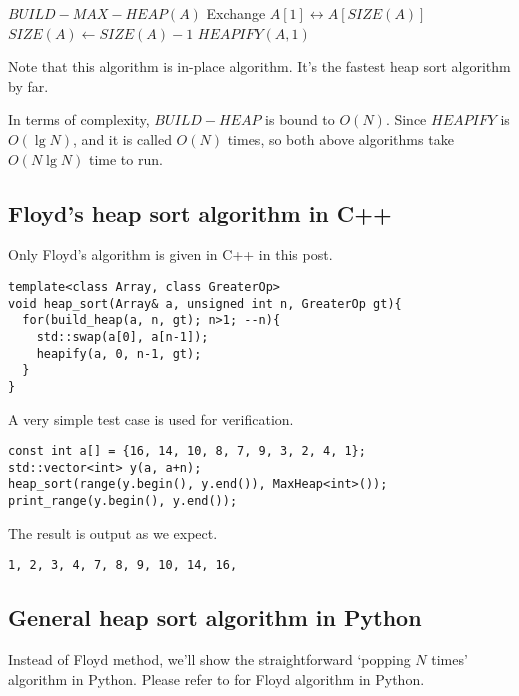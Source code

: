 \documentclass{article}
\begin{document}
\begin{algorithmic}[1]
  \State $BUILD-MAX-HEAP(A)$
    \State Exchange $A[1] \leftrightarrow A[SIZE(A)]$
    \State $SIZE(A) \gets SIZE(A) - 1$
    \State $HEAPIFY(A, 1)$
  \EndWhile
\EndFunction
\end{algorithmic}

Note that this algorithm is in-place algorithm. It's the
fastest heap sort algorithm by far.

In terms of complexity, $BUILD-HEAP$ is bound to $O(N)$.
Since $HEAPIFY$ is $O(\lg{N})$, and it
is called $O(N)$ times, so both above algorithms take $O(N \lg{N})$
time to run.

\subsection*{Floyd's heap sort algorithm in C++}

Only Floyd's algorithm is given in C++ in this post.

\lstset{language=C++}
\begin{lstlisting}
template<class Array, class GreaterOp>
void heap_sort(Array& a, unsigned int n, GreaterOp gt){
  for(build_heap(a, n, gt); n>1; --n){
    std::swap(a[0], a[n-1]);
    heapify(a, 0, n-1, gt);
  }
}
\end{lstlisting}

A very simple test case is used for verification.

\begin{lstlisting}
const int a[] = {16, 14, 10, 8, 7, 9, 3, 2, 4, 1};
std::vector<int> y(a, a+n);
heap_sort(range(y.begin(), y.end()), MaxHeap<int>());
print_range(y.begin(), y.end());
\end{lstlisting}

The result is output as we expect.

\begin{verbatim}
1, 2, 3, 4, 7, 8, 9, 10, 14, 16,
\end{verbatim}

\subsection*{General heap sort algorithm in Python}

Instead of Floyd method, we'll show the straightforward
`popping $N$ times' algorithm in Python. Please refer
to \cite{rosetta-heapsort} for Floyd algorithm in Python.
\end{document}
